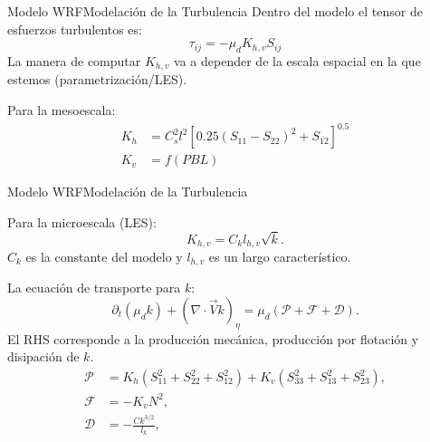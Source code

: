 \documentclass[mathserif,10pt]{beamer}
\newcommand{\be}{\begin{equation}}
\newcommand{\ee}{\end{equation}}
\begin{document}
\begin{frame}{Modelo WRF}{Modelación de la Turbulencia}
	Dentro del modelo el tensor de esfuerzos turbulentos es:
	\be \tau_{ij}=-\mu_d K_{h,v}S_{ij} \ee
	La manera de computar $K_{h,v}$ va a depender de la escala espacial en la que estemos (parametrización/LES).
	\bigskip
	
	Para la mesoescala:
	\begin{align}
	K_h &= C_s^2 l^2[0.25(S_{11}-S_{22})^2+S_{12}]^{0.5}\\
	K_v &= f(PBL)
	\end{align}
\end{frame}

\begin{frame}{Modelo WRF}{Modelación de la Turbulencia}
	
	Para la microescala (LES):
	\begin{equation}K_{h,v}=C_k l_{h,v}\sqrt{k}.\end{equation}
	$C_k$ es la constante del modelo y $l_{h,v}$ es un largo característico.
	
	La ecuación de transporte para $k$:
	\begin{equation}
	\partial_t(\mu_d k) + (\nabla\cdot\vec{V}k)_\eta = \mu_d(\mathcal{P} + \mathcal{F} + \mathcal{D}).
	\end{equation}
	El RHS corresponde a la producción mecánica, producción por flotación y disipación de $k$.
	\begin{align}
	\mathcal{P}&= K_h (S_{11}^2 + S_{22}^2 + S_{12}^2) + K_v (S_{33}^2 + S_{13}^2 + S_{23}^2),\\
	\mathcal{F}&=-K_v N^2,\\
	\mathcal{D}&=-\frac{C k^{3/2}}{l_k},
	\end{align}
\end{frame}






\end{document}
